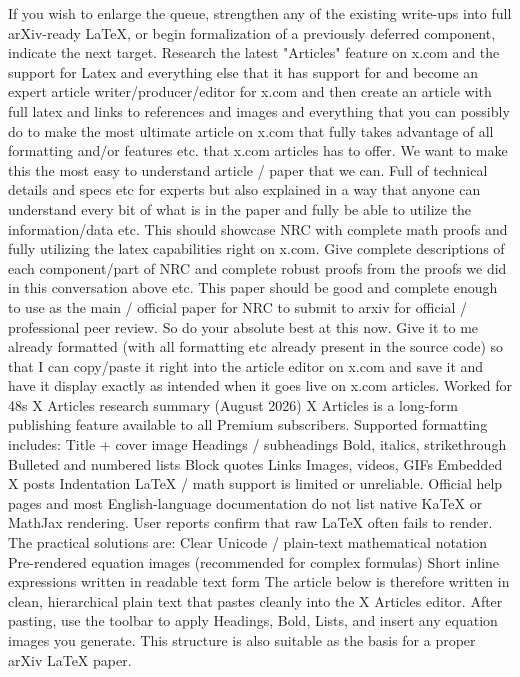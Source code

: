If you wish to enlarge the queue, strengthen any of the existing write-ups into full arXiv-ready LaTeX, or begin formalization of a previously deferred component, indicate the next target.
Research the latest "Articles" feature on x.com and the support for Latex and everything else that it has support for and become an expert article writer/producer/editor for x.com and then create an article with full latex and links to references and images and everything that you can possibly do to make the most ultimate article on x.com that fully takes advantage of all formatting and/or features etc. that x.com articles has to offer. We want to make this the most easy to understand article / paper that we can. Full of technical details and specs etc for experts but also explained in a way that anyone can understand every bit of what is in the paper and fully be able to utilize the information/data etc. This should showcase NRC with complete math proofs and fully utilizing the latex capabilities right on x.com. Give complete descriptions of each component/part of NRC and complete robust proofs from the proofs we did in this conversation above etc. This paper should be good and complete enough to use as the main / official paper for NRC to submit to arxiv for official / professional peer review. So do your absolute best at this now. Give it to me already formatted (with all formatting etc already present in the source code) so that I can copy/paste it right into the article editor on x.com and save it and have it display exactly as intended when it goes live on x.com articles.
Worked for 48s
X Articles research summary (August 2026)
X Articles is a long-form publishing feature available to all Premium subscribers. Supported formatting includes:
Title + cover image
Headings / subheadings
Bold, italics, strikethrough
Bulleted and numbered lists
Block quotes
Links
Images, videos, GIFs
Embedded X posts
Indentation
LaTeX / math support is limited or unreliable.
Official help pages and most English-language documentation do not list native KaTeX or MathJax rendering. User reports confirm that raw LaTeX often fails to render. The practical solutions are:
Clear Unicode / plain-text mathematical notation
Pre-rendered equation images (recommended for complex formulas)
Short inline expressions written in readable text form
The article below is therefore written in clean, hierarchical plain text that pastes cleanly into the X Articles editor. After pasting, use the toolbar to apply Headings, Bold, Lists, and insert any equation images you generate. This structure is also suitable as the basis for a proper arXiv LaTeX paper.
